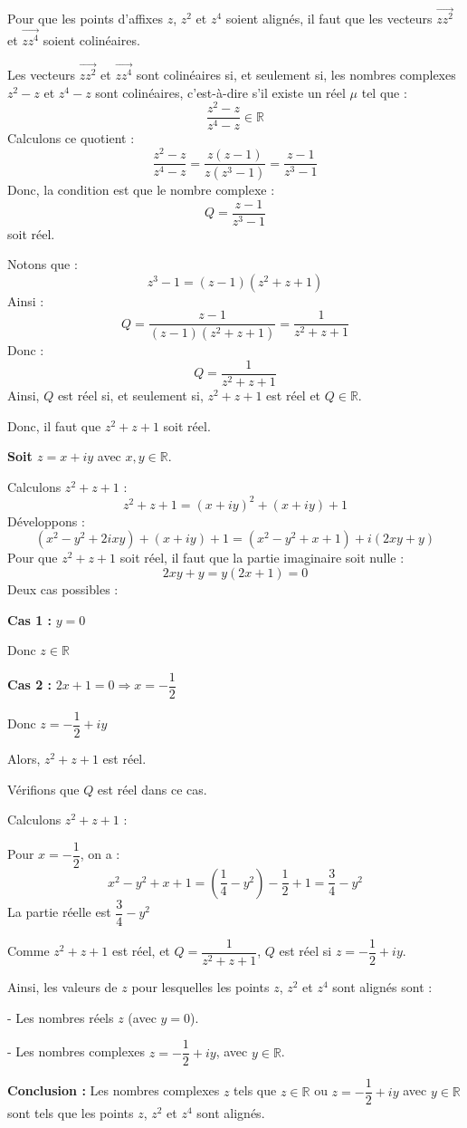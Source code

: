 \documentclass[a4paper,12pt]{article}
\begin{document}
\begin{solutionbox}
Pour que les points d'affixes \( z \), \( z^2 \) et \( z^4 \) soient alignés, il faut que les vecteurs \( \overrightarrow{z z^2} \) et \( \overrightarrow{z z^4} \) soient colinéaires.

Les vecteurs \( \overrightarrow{z z^2} \) et \( \overrightarrow{z z^4} \) sont colinéaires si, et seulement si, les nombres complexes \( z^2 - z \) et \( z^4 - z \) sont colinéaires, c'est-à-dire s'il existe un réel \( \mu \) tel que :
\[
\dfrac{z^2 - z}{z^4 - z} \in \mathbb{R}
\]
Calculons ce quotient :
\[
\dfrac{z^2 - z}{z^4 - z} = \dfrac{z(z - 1)}{z(z^3 - 1)} = \dfrac{z - 1}{z^3 - 1}
\]
Donc, la condition est que le nombre complexe :
\[
Q = \dfrac{z - 1}{z^3 - 1}
\]
soit réel.

Notons que :
\[
z^3 - 1 = (z - 1)(z^2 + z + 1)
\]
Ainsi :
\[
Q = \dfrac{z - 1}{(z - 1)(z^2 + z + 1)} = \dfrac{1}{z^2 + z + 1}
\]
Donc :
\[
Q = \dfrac{1}{z^2 + z + 1}
\]
Ainsi, \( Q \) est réel si, et seulement si, \( z^2 + z + 1 \) est réel et \( Q \in \mathbb{R} \).

Donc, il faut que \( z^2 + z + 1 \) soit réel.

\textbf{Soit \( z = x + i y \)} avec \( x, y \in \mathbb{R} \).

Calculons \( z^2 + z + 1 \) :
\[
z^2 + z + 1 = (x + i y)^2 + (x + i y) + 1
\]
Développons :
\[
(x^2 - y^2 + 2i x y) + (x + i y) + 1 = (x^2 - y^2 + x + 1) + i (2 x y + y)
\]
Pour que \( z^2 + z + 1 \) soit réel, il faut que la partie imaginaire soit nulle :
\[
2 x y + y = y (2 x + 1) = 0
\]
Deux cas possibles :

\textbf{Cas 1 :} \( y = 0 \)

Donc \( z \in \mathbb{R} \)

\textbf{Cas 2 :} \( 2 x + 1 = 0 \Rightarrow x = -\dfrac{1}{2} \)

Donc \( z = -\dfrac{1}{2} + i y \)

Alors, \( z^2 + z + 1 \) est réel.

Vérifions que \( Q \) est réel dans ce cas.

Calculons \( z^2 + z + 1 \) :

Pour \( x = -\dfrac{1}{2} \), on a :
\[
x^2 - y^2 + x + 1 = \left( \dfrac{1}{4} - y^2 \right) - \dfrac{1}{2} + 1 = \dfrac{3}{4} - y^2
\]
La partie réelle est \( \dfrac{3}{4} - y^2 \)

Comme \( z^2 + z + 1 \) est réel, et \( Q = \dfrac{1}{z^2 + z + 1} \), \( Q \) est réel si \( z = -\dfrac{1}{2} + i y \).

Ainsi, les valeurs de \( z \) pour lesquelles les points \( z \), \( z^2 \) et \( z^4 \) sont alignés sont :

- Les nombres réels \( z \) (avec \( y = 0 \)).

- Les nombres complexes \( z = -\dfrac{1}{2} + i y \), avec \( y \in \mathbb{R} \).

\textbf{Conclusion :} Les nombres complexes \( z \) tels que \( z \in \mathbb{R} \) ou \( z = -\dfrac{1}{2} + i y \) avec \( y \in \mathbb{R} \) sont tels que les points \( z \), \( z^2 \) et \( z^4 \) sont alignés.

\end{solutionbox}
\end{document}

